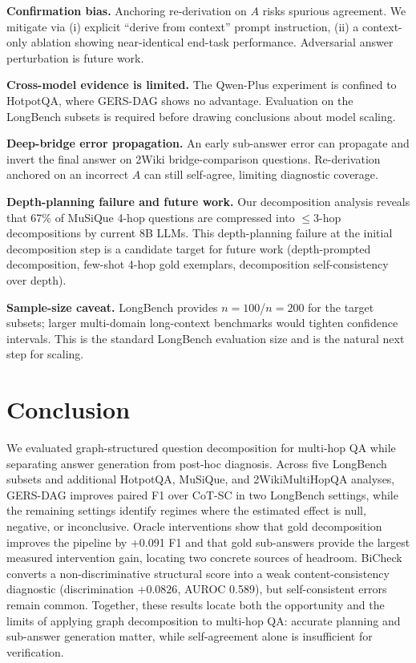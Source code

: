 \documentclass[letterpaper]{article} %
\begin{document}
\noindent\textbf{Confirmation bias.} Anchoring re-derivation on $A$ risks spurious agreement. We mitigate via (i) explicit ``derive from context'' prompt instruction, (ii) a context-only ablation showing near-identical end-task performance. Adversarial answer perturbation is future work.

\noindent\textbf{Cross-model evidence is limited.} The Qwen-Plus experiment is confined to HotpotQA, where GERS-DAG shows no advantage. Evaluation on the LongBench subsets is required before drawing conclusions about model scaling.

\noindent\textbf{Deep-bridge error propagation.} An early sub-answer error can propagate and invert the final answer on 2Wiki bridge-comparison questions. Re-derivation anchored on an incorrect $A$ can still self-agree, limiting diagnostic coverage.

\noindent\textbf{Depth-planning failure and future work.} Our decomposition analysis reveals that 67\% of MuSiQue 4-hop questions are compressed into ${\leq}3$-hop decompositions by current 8B LLMs. This depth-planning failure at the initial decomposition step is a candidate target for future work (depth-prompted decomposition, few-shot 4-hop gold exemplars, decomposition self-consistency over depth).

\noindent\textbf{Sample-size caveat.} LongBench provides $n{=}100$/$n{=}200$ for the target subsets; larger multi-domain long-context benchmarks would tighten confidence intervals. This is the standard LongBench evaluation size and is the natural next step for scaling.

\section{Conclusion}

We evaluated graph-structured question decomposition for multi-hop QA while separating answer generation from post-hoc diagnosis. Across five LongBench subsets and additional HotpotQA, MuSiQue, and 2WikiMultiHopQA analyses, GERS-DAG improves paired F1 over CoT-SC in two LongBench settings, while the remaining settings identify regimes where the estimated effect is null, negative, or inconclusive. Oracle interventions show that gold decomposition improves the pipeline by +0.091 F1 and that gold sub-answers provide the largest measured intervention gain, locating two concrete sources of headroom. BiCheck converts a non-discriminative structural score into a weak content-consistency diagnostic (discrimination $+0.0826$, AUROC 0.589), but self-consistent errors remain common. Together, these results locate both the opportunity and the limits of applying graph decomposition to multi-hop QA: accurate planning and sub-answer generation matter, while self-agreement alone is insufficient for verification.


\end{document}
